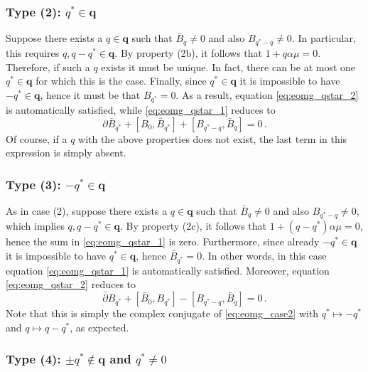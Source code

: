 \documentclass[11pt,a4paper]{article}
\numberwithin{equation}{section}
\numberwithin{table}{section}\setlength{\multlinegap}{25pt}
\begin{document}
\subsubsection*{Type (2): $q^*\in\mathbf{q}$}

Suppose there exists a $q\in\mathbf{q}$ such that $\bar{B}_q\neq 0$ and also $B_{q^*-q}\neq 0$. In particular, this requires $q,q-q^*\in\mathbf{q}$. By property (2b), it follows that $1+q\alpha\mu=0$. Therefore, if such a $q$ exists it must be unique. In fact, there can be at most one $q^*\in\mathbf{q}$ for which this is the case. Finally, since $q^*\in\mathbf{q}$ it is impossible to have $-q^*\in\mathbf{q}$, hence it must be that $B_{q^*}=0$. As a result, equation \eqref{eq:eomg_qstar_2} is automatically satisfied, while \eqref{eq:eomg_qstar_1} reduces to
\begin{equation}\label{eq:eomg_case2}
	\partial\bar{B}_{q^*}+[B_0,\bar{B}_{q^*}]+[B_{q^*-q},\bar{B}_q]=0\,.
\end{equation}
Of course, if a $q$ with the above properties does not exist, the last term in this expression is simply absent. 

\subsubsection*{Type (3): $-q^*\in\mathbf{q}$}

As in case (2), suppose there exists a $q\in\mathbf{q}$ such that $\bar{B}_q\neq 0$ and also $B_{q^*-q}\neq 0$, which implies $q,q-q^*\in\mathbf{q}$. By property (2c), it follows that $1+(q-q^*)\alpha\mu=0$, hence the sum in \eqref{eq:eomg_qstar_1} is zero. Furthermore, since already $-q^*\in\mathbf{q}$ it is impossible to have $q^*\in\mathbf{q}$, hence $\bar{B}_{q^*}=0$. In other words, in this case equation \eqref{eq:eomg_qstar_1} is automatically satisfied. Moreover, equation \eqref{eq:eomg_qstar_2} reduces to
\begin{equation}
	\bar{\partial}B_{q^*}+[\bar{B}_0,B_{q^*}]-[B_{q^*-q},\bar{B}_q]=0\,.
\end{equation}
Note that this is simply the complex conjugate of \eqref{eq:eomg_case2} with $q^*\mapsto -q^*$ and $q\mapsto q-q^*$, as expected. 

\subsubsection*{Type (4): $\pm q^*\not\in\mathbf{q}$ and $q^*\neq 0$}
\end{document}
